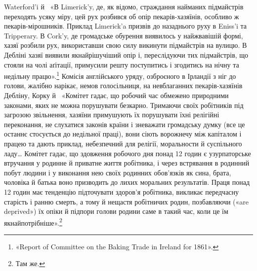 \parcont{}  %
Waterford’i й~ «В Limerick’y, де, як відомо, страждання
найманих підмайстрів переходять усяку міру, цей рух розбився
об опір пекарів-хазяїнів, особливо ж пекарів-мірошників. Приклад
Limerick’a призвів до назаднього руху в Eniss’i та Tripperary.
В Cork’y, де громадське обурення виявилось у найжвавішій
формі, хазяї розбили рух, використавши свою силу викинути підмайстрів
на вулицю. В Дебліні хазяї виявили якнайрішучіший
опір і, переслідуючи тих підмайстрів, що стояли на чолі аґітації,
примусили решту поступитись і згодитись на нічну та недільну
працю».\footnote{
«Report of Committee on the Baking Trade in Ireland for 1861».
} Комісія англійського уряду, озброєного в Ірландії
з ніг до голови, жалібно нарікає, немов голосільниця, на невблаганних
пекарів-хазяїнів Дебліну, Корку й~ «Комітет гадає,
що робочий час обмежено природними законами, яких не можна
порушувати безкарно. Тримаючи своїх робітників під загрозою
звільнення, хазяїни примушують їх порушувати їхні релігійні
переконання, не слухатися законів країни і зневажати громадську
думку (все це останнє стосується до недільної праці), вони сіють
ворожнечу між капіталом і працею та дають приклад, небезпечний
для релігії, моральности й суспільного ладу\dots{} Комітет гадає,
що здовження робочого дня понад 12 годин є узурпаторське втручання
у родинне й приватне життя робітника, і через встрявання
в родинний побут людини і у виконання нею своїх родинних обов’язків
як сина, брата, чоловіка й батька воно призводить до лихих
моральних результатів. Праця понад 12 годин має тенденцію підточувати
здоров’я робітника, викликає передчасну старість і
ранню смерть, а тому й нещастя робітничих родин, позбавляючи
(«are deprived») їх опіки й підпори голови родини саме в такий
час, коли це їм якнайпотрібніше».\footnote{Там же.}


